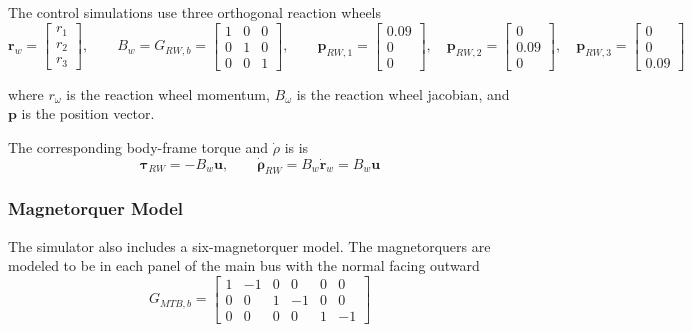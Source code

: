 \documentclass[conference,onecolumn,draftclsnofoot]{IEEEtran}
\begin{document}
The control simulations use three orthogonal reaction wheels
\begin{equation}
\mathbf r_w = \begin{bmatrix} r_1\\r_2\\r_3 \end{bmatrix},\qquad
B_w = G_{RW,b} = \begin{bmatrix} 1 & 0 & 0\\ 0 & 1 & 0\\ 0 & 0 & 1 \end{bmatrix},\qquad
\mathbf p_{RW,1} = \begin{bmatrix} 0.09\\0\\0 \end{bmatrix},\quad
\mathbf p_{RW,2} = \begin{bmatrix} 0\\0.09\\0 \end{bmatrix},\quad
\mathbf p_{RW,3} = \begin{bmatrix} 0\\0\\0.09 \end{bmatrix}
\end{equation}

where $r_{\omega}$ is the reaction wheel momentum, $B_{\omega}$ is the reaction wheel jacobian, and $\mathbf{p}$ is the position vector.

The corresponding body-frame torque and $\dot{\rho}$ is is
\begin{equation}
\boldsymbol{\tau}_{RW} = -B_w\mathbf u,\qquad
\dot{\boldsymbol{\rho}}_{RW} = B_w\dot{\mathbf r}_w = B_w\mathbf u
\end{equation}

\subsubsection{Magnetorquer Model}

The simulator also includes a six-magnetorquer model. The magnetorquers are modeled to be in each panel of the main bus with the normal facing outward
\begin{equation}
G_{MTB,b}
=
\begin{bmatrix}
1 & -1 & 0 & 0 & 0 & 0\\
0 & 0 & 1 & -1 & 0 & 0\\
0 & 0 & 0 & 0 & 1 & -1
\end{bmatrix}
\end{equation}
\end{document}
